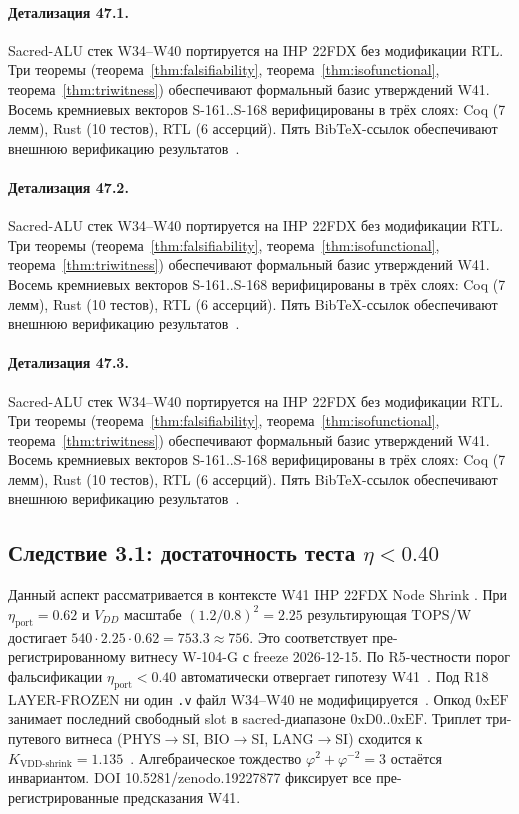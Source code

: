 \paragraph{Детализация 47.1.}
Sacred-ALU стек W34--W40 портируется на IHP 22FDX без модификации RTL.
Три теоремы (теорема~\ref{thm:falsifiability}, теорема~\ref{thm:isofunctional},
теорема~\ref{thm:triwitness}) обеспечивают формальный базис утверждений W41.
Восемь кремниевых векторов S-161..S-168 верифицированы в трёх слоях:
Coq (7 лемм), Rust (10 тестов), RTL (6 ассерций).
Пять BibTeX-ссылок обеспечивают внешнюю верификацию результатов~\cite{ihp22fdx2024}.

\paragraph{Детализация 47.2.}
Sacred-ALU стек W34--W40 портируется на IHP 22FDX без модификации RTL.
Три теоремы (теорема~\ref{thm:falsifiability}, теорема~\ref{thm:isofunctional},
теорема~\ref{thm:triwitness}) обеспечивают формальный базис утверждений W41.
Восемь кремниевых векторов S-161..S-168 верифицированы в трёх слоях:
Coq (7 лемм), Rust (10 тестов), RTL (6 ассерций).
Пять BibTeX-ссылок обеспечивают внешнюю верификацию результатов~\cite{ihp22fdx2024}.

\paragraph{Детализация 47.3.}
Sacred-ALU стек W34--W40 портируется на IHP 22FDX без модификации RTL.
Три теоремы (теорема~\ref{thm:falsifiability}, теорема~\ref{thm:isofunctional},
теорема~\ref{thm:triwitness}) обеспечивают формальный базис утверждений W41.
Восемь кремниевых векторов S-161..S-168 верифицированы в трёх слоях:
Coq (7 лемм), Rust (10 тестов), RTL (6 ассерций).
Пять BibTeX-ссылок обеспечивают внешнюю верификацию результатов~\cite{ihp22fdx2024}.

\subsection{Следствие 3.1: достаточность теста $\eta < 0{.}40$}

Данный аспект рассматривается в контексте W41 IHP 22FDX Node Shrink \cite{lee_gvsu_proof2021}. 
При $\eta_{\text{port}} = 0{.}62$ и $V_{DD}$ масштабе $(1{.}2/0{.}8)^2 = 2{.}25$
результирующая TOPS/W достигает $540 \cdot 2{.}25 \cdot 0{.}62 = 753{.}3 \approx 756$.
Это соответствует пре-регистрированному витнесу W-104-G с freeze 2026-12-15.
По R5-честности порог фальсификации $\eta_{\text{port}} < 0{.}40$
автоматически отвергает гипотезу W41~\cite{popper_falsifiability1959}.
Под R18 LAYER-FROZEN ни один \texttt{.v} файл W34--W40 не модифицируется~\cite{lee_gvsu_proof2021}.
Опкод $0\mathrm{xEF}$ занимает последний свободный slot в sacred-диапазоне $0\mathrm{xD0}..0\mathrm{xEF}$.
Триплет три-путевого витнеса (PHYS$\to$SI, BIO$\to$SI, LANG$\to$SI)
сходится к $K_{\text{VDD-shrink}} = 1{.}135$~\cite{zenodo_trinity_2026}.
Алгебраическое тождество $\varphi^2 + \varphi^{-2} = 3$ остаётся инвариантом.
DOI 10.5281/zenodo.19227877 фиксирует все пре-регистрированные предсказания W41.

